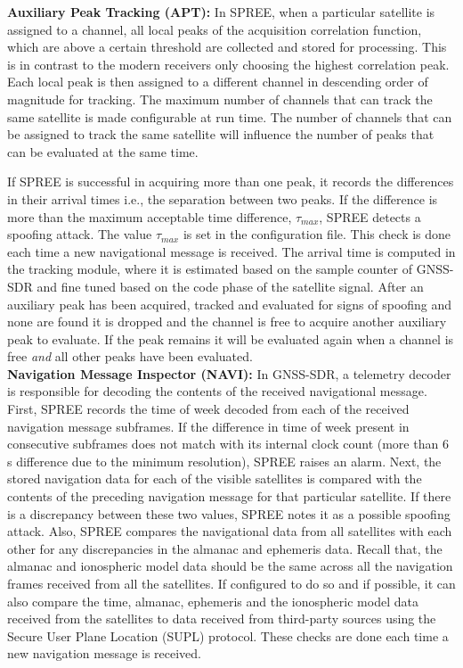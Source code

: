 \documentclass[letterpaper,twocolumn,10pt]{article}
\newcommand{\ie}{i.e.,\xspace}
\newcommand{\rxname}{SPREE\xspace}
\begin{document}
\noindent\textbf{Auxiliary Peak Tracking (APT):} In SPREE, when a particular satellite is assigned to a channel, all local peaks of the acquisition correlation function, which are above a certain threshold are collected and stored for processing. This is in contrast to the modern receivers only choosing the highest correlation peak. Each local peak is then assigned to a different channel in descending order of magnitude for tracking. The maximum number of channels that can track the same satellite is made configurable at run time. The number of channels that can be assigned to track the same satellite will influence the number of peaks that can be evaluated at the same time.

If \rxname is successful in acquiring more than one peak, it records the differences in their arrival times \ie the separation between two peaks.  If the difference is more than the maximum acceptable time difference, $\tau_{max}$, \rxname detects a spoofing attack. The value  $\tau_{max}$  is set in the configuration file. This check is done each time a new navigational message is received. The arrival time is computed in the tracking module, where it is estimated based on the sample counter of GNSS-SDR and fine tuned based on the code phase of the satellite signal. After an auxiliary peak has been acquired, tracked and evaluated for signs of spoofing and none are found it is dropped and the channel is free to acquire another auxiliary peak to evaluate. If the peak remains it will be evaluated again when a channel is free \textit{and} all other peaks have been evaluated.\\





\noindent\textbf{Navigation Message Inspector (NAVI):} In GNSS-SDR, a telemetry decoder is responsible for decoding the contents of the received navigational message. First, \rxname records the time of week decoded from each of the received navigation message subframes. If the  difference in time of week present in consecutive subframes does not match with its internal clock count (more than 6 s difference due to the minimum resolution), \rxname raises an alarm. Next, the stored navigation data for each of the visible satellites is compared with the contents of the preceding navigation message for that particular satellite. If there is a discrepancy between these two values, \rxname notes it as a possible spoofing attack. Also, \rxname compares the navigational data from all satellites with each other for any discrepancies in the almanac and ephemeris data. Recall that, the almanac and ionospheric model data should be the same across all the navigation frames received from all the satellites. If configured to do so and if possible, it can also compare the time, almanac, ephemeris and the ionospheric model data received from the satellites to data received from third-party sources using the Secure User Plane Location (SUPL) protocol. These checks are done each time a new navigation message is received.\\
\end{document}
